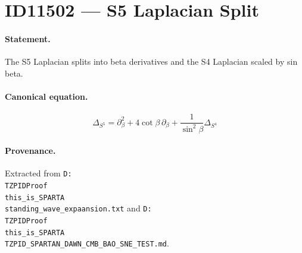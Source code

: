 \section*{ID11502 --- S5 Laplacian Split}

\paragraph{Statement.}
The S5 Laplacian splits into beta derivatives and the S4 Laplacian scaled by sin beta.

\paragraph{Canonical equation.}
\[
\Delta_{S^5}=\partial_\beta^2+4\cot\beta\,\partial_\beta+\frac{1}{\sin^2\beta}\Delta_{S^4}
\]

\paragraph{Provenance.}
Extracted from \texttt{D:\\TZPIDProof\\this\_is\_SPARTA\\standing\_wave\_expaansion.txt} and \texttt{D:\\TZPIDProof\\this\_is\_SPARTA\\TZPID\_SPARTAN\_DAWN\_CMB\_BAO\_SNE\_TEST.md}.
